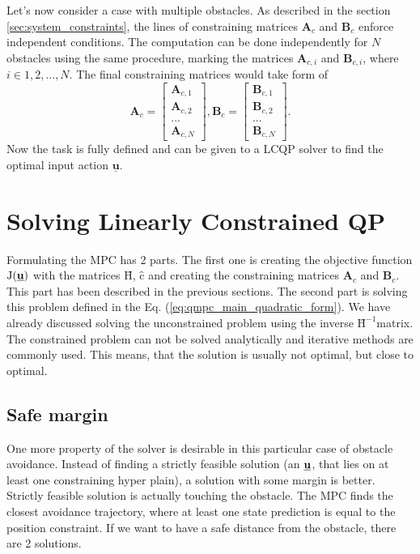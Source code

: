 \documentclass[a4paper,11pt,titlepage]{article}
\newcommand{\uvec}{\textbf{\underline{u}}}
\newcommand{\macJ}{\mathrm{J}(\uvec)}
\newcommand{\macHr}{\textbf{\^H}}
\begin{document}
Let's now consider a case with multiple obstacles. As described in the section \ref{sec:system_constraints}, the lines of constraining matrices $\textbf{A}_c$ and $\textbf{B}_c$  enforce independent conditions. The computation can be done independently for $N$ obstacles using the same procedure, marking the matrices $\textbf{A}_{c,i}$ and $\textbf{B}_{c,i}$, where $i \in {1, 2, ..., N}$. The final constraining matrices would take form of
\begin{equation}
\textbf{A}_c =
  \begin{bmatrix}
  \textbf{A}_{c,1} \\
  \textbf{A}_{c,2} \\
  ...	   \\
  \textbf{A}_{c,N}
  \end{bmatrix},\textbf{B}_c = \begin{bmatrix}
  \textbf{B}_{c,1} \\
  \textbf{B}_{c,2} \\
  ...	   \\
  \textbf{B}_{c,N}
  \end{bmatrix}.
\end{equation}
Now the task is fully defined and can be given to a LCQP solver to find the optimal input action $\underline{\textbf{u}}$. 

\section{Solving Linearly Constrained QP}
Formulating the MPC has 2 parts. The first one is creating the objective function $\macJ$ with the matrices $\textbf{\^H}$, $\textbf{\^c}$ and creating the constraining matrices $\textbf{A}_c$ and $\textbf{B}_c$. This part has been described in the previous sections. The second part is solving this problem defined in the Eq. (\ref{eq:qmpc_main_quadratic_form}). We have already discussed solving the unconstrained problem using the inverse $\macHr^{-1}$matrix. The constrained problem can not be solved analytically and iterative methods are commonly used. This means, that the solution is usually not optimal, but close to optimal. 

\subsection{Safe margin}
\label{sec:safe_margin}
One more property of the solver is desirable in this particular case of obstacle avoidance. Instead of finding a strictly feasible solution (an $\uvec$, that lies on at least one constraining hyper plain), a solution with some margin is better. Strictly feasible solution is actually touching the obstacle. The MPC finds the closest avoidance trajectory, where at least one state prediction is equal to the position constraint. If we want to have a safe distance from the obstacle, there are 2 solutions. 
\end{document}
